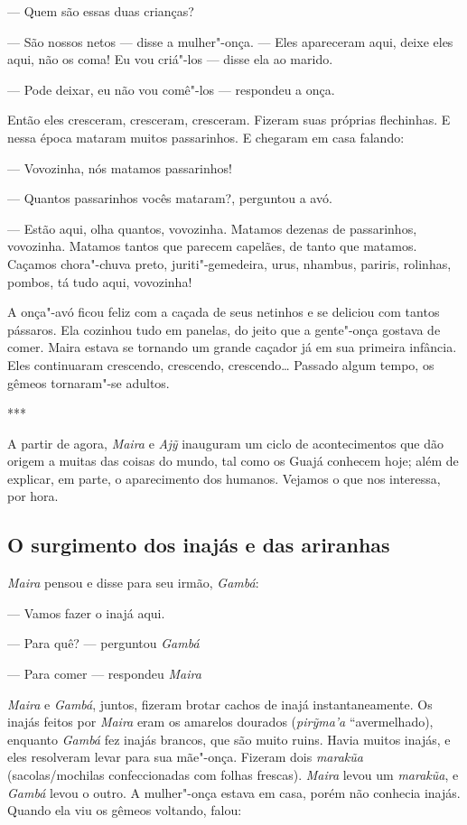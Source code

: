 --- Quem são essas duas crianças?

--- São nossos netos --- disse a mulher"-onça. --- Eles apareceram aqui,
deixe eles aqui, não os coma! Eu vou criá"-los --- disse ela ao
marido.

--- Pode deixar, eu não vou comê"-los --- respondeu a onça.

Então eles cresceram, cresceram, cresceram. Fizeram suas próprias
flechinhas. E nessa época mataram muitos passarinhos. E chegaram em casa
falando:

--- Vovozinha, nós matamos passarinhos!

--- Quantos passarinhos vocês mataram?, perguntou a avó.

--- Estão aqui, olha quantos, vovozinha. Matamos dezenas de passarinhos,
vovozinha. Matamos tantos que parecem capelães, de tanto que matamos.
Caçamos chora"-chuva preto, juriti"-gemedeira, urus, nhambus, pariris,
rolinhas, pombos, tá tudo aqui, vovozinha!

A onça"-avó ficou feliz com a caçada de seus netinhos e se deliciou com
tantos pássaros. Ela cozinhou tudo em panelas, do jeito que a gente"-onça
gostava de comer. Maira estava se tornando um grande caçador já em sua
primeira infância. Eles continuaram crescendo, crescendo, crescendo\ldots{}
Passado algum tempo, os gêmeos tornaram"-se adultos.

\begin{center}
***
\end{center}

A partir de agora, \emph{Maira} e \emph{Ajỹ} inauguram um ciclo de
acontecimentos que dão origem a muitas das coisas do mundo, tal como os
Guajá conhecem hoje; além de explicar, em parte, o aparecimento dos
humanos. Vejamos o que nos interessa, por hora.

\subsection{O surgimento dos inajás e das ariranhas}

\forceindent\emph{Maira} pensou e disse para seu irmão, \emph{Gambá}:

--- Vamos fazer o inajá aqui.

--- Para quê? --- perguntou \emph{Gambá}

--- Para comer --- respondeu \emph{Maira}

\emph{Maira} e \emph{Gambá}, juntos, fizeram brotar cachos de inajá
instantaneamente. Os inajás feitos por \emph{Maira} eram os amarelos
dourados (\emph{pirỹma'a} ``avermelhado), enquanto \emph{Gambá} fez
inajás brancos, que são muito ruins. Havia muitos inajás, e eles
resolveram levar para sua mãe"-onça. Fizeram dois \emph{marakũa}
(sacolas/mochilas confeccionadas com folhas frescas). \emph{Maira} levou
um \emph{marakũa}, e \emph{Gambá} levou o outro. A mulher"-onça estava em
casa, porém não conhecia inajás. Quando ela viu os gêmeos voltando,
falou:


